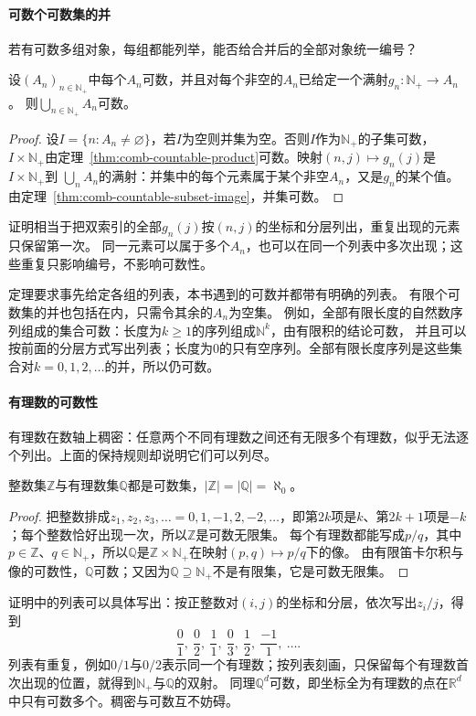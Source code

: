 \paragraph{可数个可数集的并}
若有可数多组对象，每组都能列举，能否给合并后的全部对象统一编号？
\begin{theorem}[可数并的可数性]
\label{thm:comb-countable-union}
设$(A_n)_{n\in\mathbb N_+}$中每个$A_n$可数，并且对每个非空的$A_n$已给定一个满射$g_n:\mathbb N_+\to A_n$。
则$\bigcup_{n\in\mathbb N_+}A_n$可数。
\end{theorem}
\begin{proof}
设$I=\{n:A_n\neq\varnothing\}$，若$I$为空则并集为空。否则$I$作为$\mathbb N_+$的子集可数，
$I\times\mathbb N_+$由定理~\ref{thm:comb-countable-product}可数。映射$(n,j)\mapsto g_n(j)$是$I\times\mathbb N_+$到
$\bigcup_nA_n$的满射：并集中的每个元素属于某个非空$A_n$，又是$g_n$的某个值。由定理~\ref{thm:comb-countable-subset-image}，并集可数。
\end{proof}
证明相当于把双索引的全部$g_n(j)$按$(n,j)$的坐标和分层列出，重复出现的元素只保留第一次。
同一元素可以属于多个$A_n$，也可以在同一个列表中多次出现；这些重复只影响编号，不影响可数性。

定理要求事先给定各组的列表，本书遇到的可数并都带有明确的列表。
有限个可数集的并也包括在内，只需令其余的$A_n$为空集。
例如，全部有限长度的自然数序列组成的集合可数：长度为$k\geq1$的序列组成$\mathbb N^k$，由有限积的结论可数，
并且可以按前面的分层方式写出列表；长度为$0$的只有空序列。全部有限长度序列是这些集合对$k=0,1,2,\ldots$的并，所以仍可数。

\paragraph{有理数的可数性}
有理数在数轴上稠密：任意两个不同有理数之间还有无限多个有理数，似乎无法逐个列出。上面的保持规则却说明它们可以列尽。
\begin{theorem}[有理数可数]
\label{thm:card-rationals-countable}
整数集$\mathbb Z$与有理数集$\mathbb Q$都是可数集，$|\mathbb Z|=|\mathbb Q|=\aleph_0$。
\end{theorem}
\begin{proof}
把整数排成$z_1,z_2,z_3,\ldots=0,1,-1,2,-2,\ldots$，即第$2k$项是$k$、第$2k+1$项是$-k$；每个整数恰好出现一次，所以$\mathbb Z$是可数无限集。
每个有理数都能写成$p/q$，其中$p\in\mathbb Z$、$q\in\mathbb N_+$，所以$\mathbb Q$是$\mathbb Z\times\mathbb N_+$在映射$(p,q)\mapsto p/q$下的像。
由有限笛卡尔积与像的可数性，$\mathbb Q$可数；又因为$\mathbb Q\supseteq\mathbb N_+$不是有限集，它是可数无限集。
\end{proof}
证明中的列表可以具体写出：按正整数对$(i,j)$的坐标和分层，依次写出$z_i/j$，得到
\[
 \frac{0}{1},\ \frac{0}{2},\ \frac{1}{1},\ \frac{0}{3},\ \frac{1}{2},\ \frac{-1}{1},\ \ldots.
\]
列表有重复，例如$0/1$与$0/2$表示同一个有理数；按列表刻画，只保留每个有理数首次出现的位置，就得到$\mathbb N_+$与$\mathbb Q$的双射。
同理$\mathbb Q^d$可数，即坐标全为有理数的点在$\mathbb R^d$中只有可数多个。稠密与可数互不妨碍。

